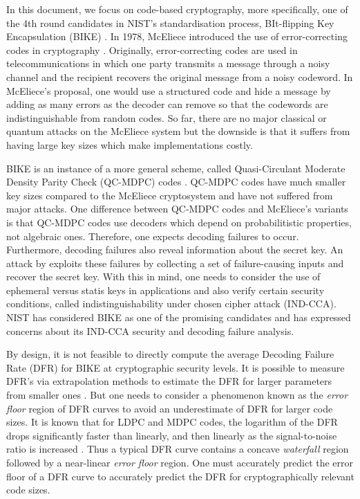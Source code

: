 In this document, we focus on code-based cryptography, more specifically, one of the 4th round candidates in NIST's standardisation process, BIt-flipping Key Encapsulation (BIKE) \cite{BIKE}. In 1978, McEliece introduced the use of error-correcting codes in cryptography \cite{mceliece}. Originally, error-correcting codes are used in telecommunications in which one party transmits a message through a noisy channel and the recipient recovers the original message from a noisy codeword. In McEliece's proposal, one would use a structured code and hide a message by adding as many errors as the decoder can remove so that the codewords are indistinguishable from random codes. So far, there are no major classical or quantum attacks on the McEliece system but the downside is that it suffers from having large key sizes which make implementations costly.

BIKE is an instance of a more general scheme, called Quasi-Circulant Moderate Density Parity Check (QC-MDPC) codes \cite{QCMDPC}. QC-MDPC codes have much smaller key sizes compared to the McEliece cryptosystem and have not suffered from major attacks. One difference between QC-MDPC codes and McEliece's variants is that QC-MDPC codes use decoders which depend on probabilitistic properties, not algebraic ones. Therefore, one expects decoding failures to occur. Furthermore, decoding failures also reveal information about the secret key. An attack by \cite{GJS} exploits these failures by collecting a set of failure-causing inputs and recover the secret key. With this in mind, one needs to consider the use of ephemeral versus statis keys in applications and also verify certain security conditions, called indistinguishability under chosen cipher attack (IND-CCA). NIST has considered BIKE as one of the promising candidates and has expressed concerns about its IND-CCA security and decoding failure analysis. 

By design, it is not feasible to directly compute the average Decoding Failure Rate (DFR) for BIKE at cryptographic security levels. It is possible to measure DFR's via extrapolation methods to estimate the DFR for larger parameters from smaller ones \cite{SV:2019:extrapolate,DGK20a}. But one needs to consider a phenomenon known as the \textit{error floor} region of DFR curves to avoid an underestimate of DFR for larger code sizes.  It is known that for LDPC and MDPC codes, the logarithm of the DFR drops significantly faster than linearly, and then linearly as the signal-to-noise ratio is increased \cite{bgf,Richardson03}. Thus a typical DFR curve contains a concave \textit{waterfall} region followed by a near-linear \textit{error floor} region. One must accurately predict the error floor of a DFR curve to accurately predict the DFR for cryptographically relevant code sizes.


